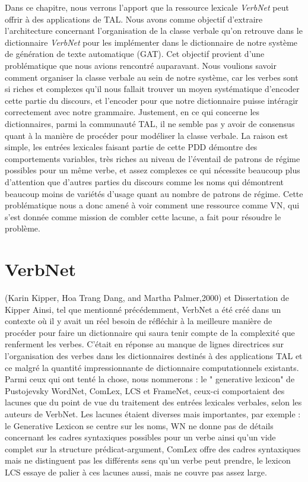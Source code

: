 \documentclass[12pt,maitrise,frenchb,natbib,twoside,initial]{dms}
\numberwithin{equation}{section}
\numberwithin{table}{chapter}
\numberwithin{figure}{chapter}
\begin{document}
Dans ce chapitre, nous verrons l'apport que la ressource lexicale \emph{VerbNet} peut offrir à des applications de TAL. Nous avons comme objectif d'extraire l'architecture concernant l'organisation de la classe verbale qu'on retrouve dans le dictionnaire \emph{VerbNet} pour les implémenter dans le dictionnaire de notre système de génération de texte automatique (GAT). Cet objectif provient d'une problématique que nous avions rencontré auparavant. Nous voulions savoir comment organiser la classe verbale au sein de notre système, car les verbes sont si riches et complexes qu'il nous fallait trouver un moyen systématique d'encoder cette partie du discours, et l'encoder pour que notre dictionnaire puisse intéragir correctement avec notre grammaire.  Justement, en ce qui concerne les dictionnaires, parmi la communauté TAL,  il ne semble pas y avoir de consensus quant à la manière de procéder pour modéliser la classe verbale. La raison est simple,  les entrées lexicales faisant partie de cette PDD démontre des comportements variables, très riches au niveau de l'éventail de patrons de régime possibles pour un même verbe, et assez complexes ce qui nécessite beaucoup plus d'attention que d'autres parties du discours comme les noms qui démontrent beaucoup moins de variétés d'usage quant au nombre de patrons de régime. Cette problématique nous a donc amené à voir comment une ressource comme VN, qui s'est donnée comme mission de combler cette lacune,  a fait pour résoudre le problème.

\section{VerbNet}
(Karin Kipper, Hoa Trang Dang, and Martha Palmer,2000) et Dissertation de Kipper
Ainsi, tel que mentionné précédemment, VerbNet a été créé dans un contexte où il y avait un réel besoin de réfléchir à la meilleure manière de procéder pour faire un dictionnaire qui saura tenir compte de la complexité que renferment les verbes. C'était en réponse au manque de lignes directrices sur l'organisation des verbes dans les dictionnaires destinés à des applications TAL et ce malgré la quantité impressionnante de dictionnaire computationnels existants.  Parmi ceux qui ont tenté la chose, nous nommerons : le " generative lexicon" de Pustojevsky WordNet, ComLex, LCS et FrameNet, ceux-ci comportaient des lacunes que du point de vue du traitement des entrées lexicales verbales, selon les auteurs de VerbNet. Les lacunes étaient diverses mais importantes, par exemple : le Generative Lexicon se centre sur les noms, WN ne donne pas de détails concernant les cadres syntaxiques possibles pour un verbe ainsi qu'un vide complet sur la structure prédicat-argument, ComLex offre des cadres syntaxiques mais ne distinguent pas les différents sens qu'un verbe peut prendre, le lexicon LCS essaye de palier à ces lacunes aussi, mais ne couvre pas assez large.
\end{document}
